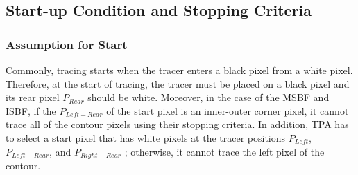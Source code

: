 \subsection{Start-up Condition and Stopping Criteria}


\subsubsection{Assumption for Start}


Commonly, tracing starts when the tracer enters a black pixel from a white pixel. Therefore, at the start of tracing, the tracer must be placed on a black pixel and its rear pixel $P_{Rear}$ should be white. Moreover, in the case of the MSBF and ISBF, if the $P_{Left-Rear}$ of the start pixel is an inner-outer corner pixel, it cannot trace all of the contour pixels using their stopping criteria\cite{Reddy2012Evaluation,Cheong2012Advanced}. In addition, TPA has to select a start pixel that has white pixels at the tracer positions $P_{Left}$, $P_{Left-Rear}$, and $P_{Right-Rear}$ \cite{Ghuneim2015Contour}; otherwise, it cannot trace the left pixel of the contour. 

